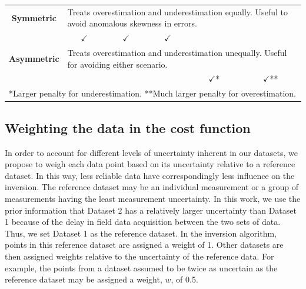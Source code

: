 \documentclass[a4paper,fleqn]{cas-sc}
\begin{document}
\begin{table}[]
\begin{tabular}{@{}lcccccc@{}}
    \multicolumn{2}{c}{\textbf{Symmetric}} & \multicolumn{5}{l}{Treats overestimation and underestimation equally. Useful to avoid anomalous skewness in errors.} \\
    \multicolumn{2}{c}{\textbf{}} & $\checkmark$                                                          & $\checkmark$                                                                     & $\checkmark$                                                             &                                                                                                     &                                                                            \\ %
    \multicolumn{2}{c}{\textbf{Asymmetric}} & \multicolumn{5}{l}{Treats overestimation and underestimation unequally. Useful for avoiding either scenario.} \\
    \multicolumn{2}{c}{\textbf{}} & \multicolumn{1}{l}{}                                                  &                                                             & \multicolumn{1}{l}{}                                                     & $\checkmark$*                         & $\checkmark$**              \\ \bottomrule
    \multicolumn{7}{l}{*Larger penalty for underestimation. **Much larger penalty for overestimation.}
    \end{tabular}
    \end{table}


\subsection{Weighting the data in the cost function} \label{subsection-met-weight}

In order to account for different levels of uncertainty inherent in our datasets, we propose to weigh each data point based on its uncertainty relative to a reference dataset. In this way, less reliable data have correspondingly less influence on the inversion. The reference dataset may be an individual measurement or a group of measurements having the least measurement uncertainty. In this work, we use the prior information that Dataset 2 has a relatively larger uncertainty than Dataset 1 because of the delay in field data acquisition between the two sets of data. Thus, we set Dataset 1 as the reference dataset. In the inversion algorithm, points in this reference dataset are assigned a weight of 1. Other datasets are then assigned weights relative to the uncertainty of the reference data. For example, the points from a dataset assumed to be twice as uncertain as the reference dataset may be assigned a weight, $w$, of 0.5. 
\end{document}
